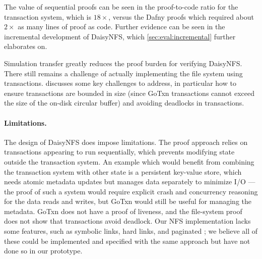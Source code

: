 The value of sequential proofs can be seen in the proof-to-code ratio for the
transaction system, which is $18\times$, versus the Dafny proofs which required
about $2\times$ as many lines of proof as code. Further evidence can be seen in
the incremental development of DaisyNFS, which \cref{sec:eval:incremental}
further elaborates on.

Simulation transfer greatly reduces the proof burden for verifying DaisyNFS.
There still remains a challenge of actually implementing the file system using
transactions.  discusses some key challenges to address,
in particular how to ensure transactions are bounded in size (since GoTxn
transactions cannot exceed the size of the on-disk circular buffer) and avoiding
deadlocks in transactions.

\paragraph{Limitations.}
The design of DaisyNFS does impose limitations. The proof approach relies on
transactions appearing to run sequentially, which prevents modifying state
outside the transaction system. An example which would benefit from combining
the transaction system with other state is a
persistent key-value store, which needs atomic metadata updates but manages data
separately to minimize I/O --- the proof of such a system would
require explicit crash and concurrency reasoning for the data reads and writes,
but GoTxn would still be useful for managing the metadata. GoTxn does not have a
proof of liveness, and the file-system proof
does not show that transactions avoid deadlock. Our NFS implementation lacks
some features, such as symbolic links, hard links, and paginated ;
we believe all of these could be implemented and specified with the same
approach but have not done so in our prototype.
